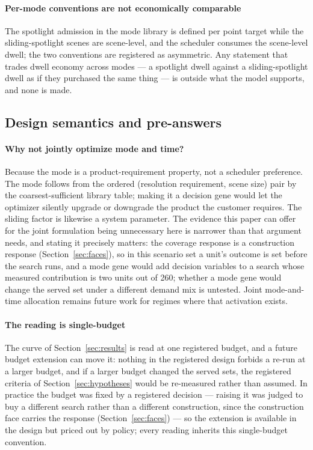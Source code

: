\documentclass[preprint,authoryear]{elsarticle}
\begin{document}
\paragraph{Per-mode conventions are not economically comparable} The spotlight admission in the mode library is defined per point target while the sliding-spotlight scenes are scene-level, and the scheduler consumes the scene-level dwell; the two conventions are registered as asymmetric. Any statement that trades dwell economy across modes --- a spotlight dwell against a sliding-spotlight dwell as if they purchased the same thing --- is outside what the model supports, and none is made.

\subsection{Design semantics and pre-answers}\label{sec:preanswers}

\paragraph{Why not jointly optimize mode and time?} Because the mode is a product-requirement property, not a scheduler preference. The mode follows from the ordered (resolution requirement, scene size) pair by the coarsest-sufficient library table; making it a decision gene would let the optimizer silently upgrade or downgrade the product the customer requires. The sliding factor is likewise a system parameter. The evidence this paper can offer for the joint formulation being unnecessary here is narrower than that argument needs, and stating it precisely matters: the coverage response is a construction response (Section~\ref{sec:faces}), so in this scenario set a unit's outcome is set before the search runs, and a mode gene would add decision variables to a search whose measured contribution is two units out of 260; whether a mode gene would change the served set under a different demand mix is untested. Joint mode-and-time allocation remains future work for regimes where that activation exists.

\paragraph{The reading is single-budget} The curve of Section~\ref{sec:results} is read at one registered budget, and a future budget extension can move it: nothing in the registered design forbids a re-run at a larger budget, and if a larger budget changed the served sets, the registered criteria of Section~\ref{sec:hypotheses} would be re-measured rather than assumed. In practice the budget was fixed by a registered decision --- raising it was judged to buy a different search rather than a different construction, since the construction face carries the response (Section~\ref{sec:faces}) --- so the extension is available in the design but priced out by policy; every reading inherits this single-budget convention.
\end{document}
